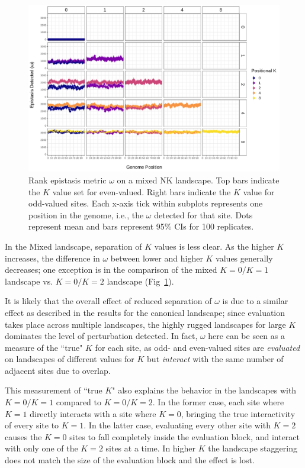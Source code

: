 \begin{figure}
    \centering
    \includegraphics[width=\textwidth]{chapters/1-rank-epistasis/figs/summary_mixed.pdf}
    \caption{Rank epistasis metric $\omega$ on a mixed NK landscape. Top bars indicate the $K$ value set for even-valued. Right bars indicate the $K$ value for odd-valued sites. Each x-axis tick within subplots represents one position in the genome, i.e., the $\omega$ detected for that site. Dots represent mean and bars represent 95\% CIs for 100 replicates.}
    \label{fig:res:mixed}
\end{figure}

In the Mixed landscape, separation of $K$ values is less clear. As the higher $K$ increases, the difference in $\omega$ between lower and higher $K$ values generally decreases; one exception is in the comparison of the mixed $K=0/K=1$ landscape vs. $K=0/K=2$ landscape (Fig~\ref{fig:res:mixed}). 

It is likely that the overall effect of reduced separation of $\omega$ is due to a similar effect as described in the results for the canonical landscape; since evaluation takes place across multiple landscapes, the highly rugged landscapes for large $K$ dominates the level of perturbation detected. In fact, $\omega$ here can be seen as a measure of the ``true" $K$ for each site, as odd- and even-valued sites are \textit{evaluated} on landscapes of different values for $K$ but \textit{interact} with the same number of adjacent sites due to overlap. 

This measurement of ``true $K$" also explains the behavior in the landscapes with $K=0/K=1$ compared to $K=0/K=2$. In the former case, each site where $K=1$ directly interacts with a site where $K=0$, bringing the true interactivity of every site to $K=1$. In the latter case, evaluating every other site with $K=2$ causes the $K=0$ sites to fall completely inside the evaluation block, and interact with only one of the $K=2$ sites at a time. In higher $K$ the landscape staggering does not match the size of the evaluation block and the effect is lost.
